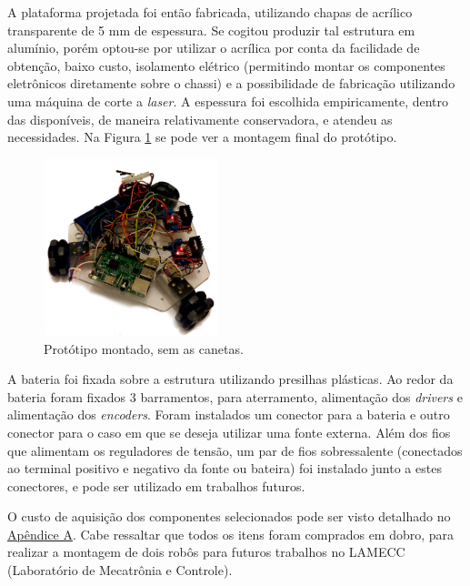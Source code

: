 A plataforma projetada foi então fabricada, utilizando chapas de acrílico transparente de 5 mm de espessura. Se cogitou produzir tal estrutura em alumínio, porém optou-se por utilizar o acrílica por conta da facilidade de obtenção, baixo custo, isolamento elétrico (permitindo montar os componentes eletrônicos diretamente sobre o chassi) e a possibilidade de fabricação utilizando uma máquina de corte a \textit{laser}. A espessura foi escolhida empiricamente, dentro das disponíveis, de maneira relativamente conservadora, e atendeu as necessidades. Na Figura \ref{fig:montagem} se pode ver a montagem final do protótipo.

\begin{figure}[h]
  \centering
  \includegraphics[width = 0.45\textwidth]{imagens/roboto}
  \caption{Protótipo montado, sem as canetas.}
  \label{fig:montagem}
\end{figure}

A bateria foi fixada sobre a estrutura utilizando presilhas plásticas. Ao redor da bateria foram fixados 3 barramentos, para aterramento, alimentação dos \textit{drivers} e alimentação dos \textit{encoders}. Foram instalados um conector para a bateria e outro conector para o caso em que se deseja utilizar uma fonte externa.  Além dos fios que alimentam os reguladores de tensão, um par de fios sobressalente (conectados ao terminal positivo e negativo da fonte ou bateira) foi instalado junto a estes conectores, e pode ser utilizado em trabalhos futuros.

O custo de aquisição dos componentes selecionados pode ser visto detalhado no \hyperref[sec:custo]{Apêndice A}. Cabe ressaltar que todos os itens foram comprados em dobro, para realizar a montagem de dois robôs para futuros trabalhos no LAMECC (Laboratório de Mecatrônia e Controle).%


